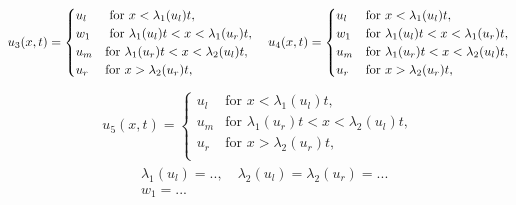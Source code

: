 \documentclass[10pt]{article}
\numberwithin{equation}{section}
\begin{document}
\begin{align}
    u_3(x,t) = \begin{cases}
    u_l  &\text{ for $x < \lambda_1(u_l)t$},\\
    w_1 &\text{ for $ \lambda_1(u_l)t < x < \lambda_1(u_r)t$},\\ 
    u_m &\text{for  $\lambda_1(u_r)t < x < \lambda_2(u_l)t$}, \\
    u_r &\text{for  $x > \lambda_2(u_r)t$}, \\
    \end{cases} \quad 
    u_4(x,t) = \begin{cases}
    u_l  &\text{for $x < \lambda_1(u_l)t$},\\
    w_1 &\text{for $\lambda_1(u_l)t < x < \lambda_1(u_r)t$}, \\ 
    u_m  &\text{for $\lambda_1(u_r)t < x < \lambda_2(u_l)t$}, \\
    u_r  &\text{for $x > \lambda_2(u_r)t$},
    \label{Eq:correspondingSolu3u4}
    \end{cases}
\end{align}
\begin{align}
    u_5(x,t) = \begin{cases}
    u_l & \text{for $x < \lambda_1(u_l)t$},\\
    u_m & \text{for $\lambda_1(u_r)t < x < \lambda_2(u_l)t$}, \\
    u_r & \text{for $x> \lambda_2(u_r)t$,} \\
    \end{cases}
    \label{Eq:u_5}
\end{align}
\begin{align*}
   & \lambda_1(u_l) = .. , \quad \lambda_2(u_l) = \lambda_2(u_r) = ... \\
   & w_1 = . . .
\end{align*}
\end{document}

